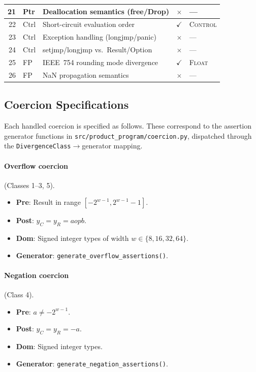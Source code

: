 \documentclass[10pt,a4paper]{article}
\begin{document}
\begin{appendices}
\begin{table}[h!]
\begin{tabular}{@{}rllcl@{}}
21 & Ptr & Deallocation semantics (free/Drop) & $\times$ & --- \\
\midrule
22 & Ctrl & Short-circuit evaluation order & $\checkmark$ &
  \textsc{Control} \\
23 & Ctrl & Exception handling (longjmp/panic) & $\times$ &
  --- \\
24 & Ctrl & setjmp/longjmp vs.\ Result/Option & $\times$ &
  --- \\
\midrule
25 & FP & IEEE~754 rounding mode divergence & $\checkmark$ &
  \textsc{Float} \\
26 & FP & NaN propagation semantics & $\times$ & --- \\
\bottomrule
\end{tabular}
\end{table}

\subsection{Coercion Specifications}

Each handled coercion is specified as follows.  These correspond to
the assertion generator functions in
\texttt{src/product\_program/coercion.py}, dispatched through the
\texttt{DivergenceClass}$\to$generator mapping.

\paragraph{Overflow coercion} (Classes 1--3, 5).
\begin{itemize}[nosep]
  \item \textbf{Pre}: Result in range $[-2^{w-1}, 2^{w-1}-1]$.
  \item \textbf{Post}: $y_C = y_R = a \mathbin{op} b$.
  \item \textbf{Dom}: Signed integer types of width $w \in \{8, 16, 32, 64\}$.
  \item \textbf{Generator}: \texttt{generate\_overflow\_assertions()}.
\end{itemize}

\paragraph{Negation coercion} (Class 4).
\begin{itemize}[nosep]
  \item \textbf{Pre}: $a \neq -2^{w-1}$.
  \item \textbf{Post}: $y_C = y_R = -a$.
  \item \textbf{Dom}: Signed integer types.
  \item \textbf{Generator}: \texttt{generate\_negation\_assertions()}.
\end{itemize}


\end{appendices}
\end{document}
